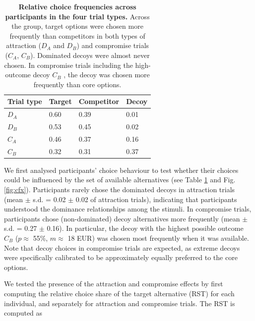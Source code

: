 \documentclass[11pt, a4paper]{article}
\begin{document}
\begin{table}[bt!]
\begin{centering}
\begin{tabular}{@{}llll@{}}
\toprule
\textbf{Trial type} & \textbf{Target} & \textbf{Competitor} & \textbf{Decoy} \\ \midrule
$D_A$               & 0.60            & 0.39                & 0.01           \\
$D_B$               & 0.53            & 0.45                & 0.02           \\
$C_A$               & 0.46            & 0.37                & 0.16           \\
$C_B$               & 0.32            & 0.31                & 0.37           \\ \bottomrule
\end{tabular}
\caption{\textbf{Relative choice frequencies across participants in the four trial types.} Across the group, target options were chosen more frequently than competitors in both types of attraction ($D_A$ and $D_B$) and compromise trials ($C_A$, $C_B$). Dominated decoys were almost never chosen. In compromise trials including the high-outcome decoy $C_B$ , the decoy was chosen more frequently than core options.}
\label{tab:choicefreqs}
\end{centering}
\end{table}

We first analysed participants' choice behaviour to test whether their choices could be influenced by the set of available alternatives (see Table \ref{tab:choicefreqs} and Fig. \ref{fig:cfx}). Participants rarely chose the dominated decoys in attraction trials (mean $\pm$ s.d. = 0.02 $\pm$ 0.02 of attraction trials), indicating that participants understood the dominance relationships among the stimuli. In compromise trials, participants chose (non-dominated) decoy alternatives more frequently (mean $\pm$ s.d. = 0.27 $\pm$ 0.16). In particular, the decoy with the highest possible outcome $C_B$ ($p \approx$ 55\%, $m \approx$ 18 EUR) was chosen most frequently when it was available. Note that decoy choices in compromise trials are expected, as extreme decoys were specifically calibrated to be approximately equally preferred to the core options. 

We tested the presence of the attraction and compromise effects by first computing the relative choice share of the target alternative (RST)\autocite{berkowitsch2014RigorouslyTestingMultialternative} for each individual, and separately for attraction and compromise trials. The RST is computed as
\end{document}
